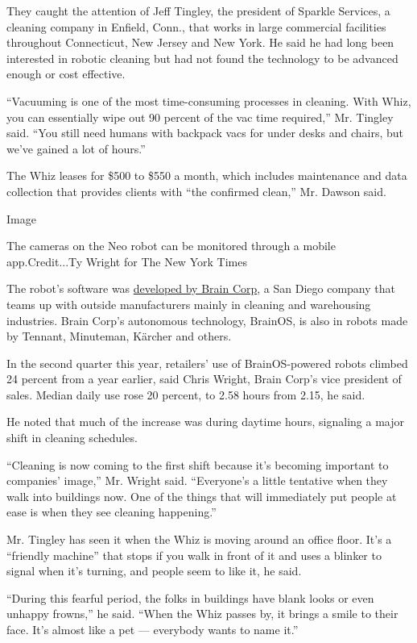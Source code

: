 They caught the attention of Jeff Tingley, the president of Sparkle
Services, a cleaning company in Enfield, Conn., that works in large
commercial facilities throughout Connecticut, New Jersey and New York.
He said he had long been interested in robotic cleaning but had not
found the technology to be advanced enough or cost effective.

``Vacuuming is one of the most time-consuming processes in cleaning.
With Whiz, you can essentially wipe out 90 percent of the vac time
required,'' Mr. Tingley said. ``You still need humans with backpack vacs
for under desks and chairs, but we've gained a lot of hours.''

The Whiz leases for \$500 to \$550 a month, which includes maintenance
and data collection that provides clients with ``the confirmed clean,''
Mr. Dawson said.

Image

The cameras on the Neo robot can be monitored through a mobile
app.Credit...Ty Wright for The New York Times

The robot's software was
\href{https://www.nytimes3xbfgragh.onion/2020/04/10/business/coronavirus-workplace-automation.html}{developed
by Brain Corp}, a San Diego company that teams up with outside
manufacturers mainly in cleaning and warehousing industries. Brain
Corp's autonomous technology, BrainOS, is also in robots made by
Tennant, Minuteman, Kärcher and others.

In the second quarter this year, retailers' use of BrainOS-powered
robots climbed 24 percent from a year earlier, said Chris Wright, Brain
Corp's vice president of sales. Median daily use rose 20 percent, to
2.58 hours from 2.15, he said.

He noted that much of the increase was during daytime hours, signaling a
major shift in cleaning schedules.

``Cleaning is now coming to the first shift because it's becoming
important to companies' image,'' Mr. Wright said. ``Everyone's a little
tentative when they walk into buildings now. One of the things that will
immediately put people at ease is when they see cleaning happening.''

Mr. Tingley has seen it when the Whiz is moving around an office floor.
It's a ``friendly machine'' that stops if you walk in front of it and
uses a blinker to signal when it's turning, and people seem to like it,
he said.

``During this fearful period, the folks in buildings have blank looks or
even unhappy frowns,'' he said. ``When the Whiz passes by, it brings a
smile to their face. It's almost like a pet --- everybody wants to name
it.''

